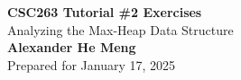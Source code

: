 \begin{titlepage}
    \null %
    \vfill
    \begin{center}
        {\fontsize{35}{48}\selectfont \bfseries CSC263 Tutorial \#2 Exercises}
        \vspace{20pt} \\
        {\LARGE Analyzing the Max-Heap Data Structure} \\
        \vspace{20pt}
        \textbf{Alexander He Meng}
        \vspace{8pt}
        \\ Prepared for January 17, 2025
    \end{center}
    \vfill
\end{titlepage}
